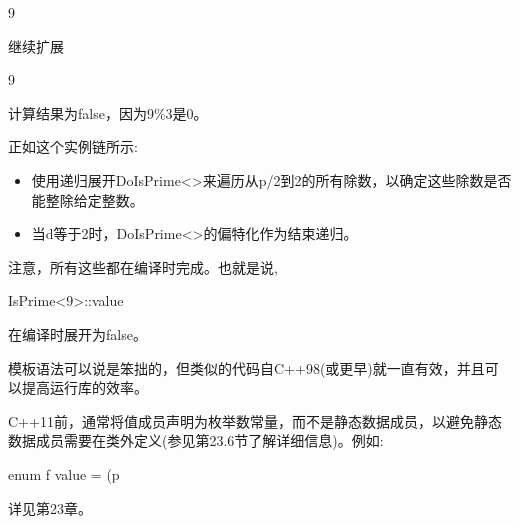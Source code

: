 \begin{cpp}
9%
\end{cpp}

继续扩展

\begin{cpp}
9%
\end{cpp}

计算结果为false，因为9\%3是0。

正如这个实例链所示:

\begin{itemize}
\item 
使用递归展开DoIsPrime<>来遍历从p/2到2的所有除数，以确定这些除数是否能整除给定整数。

\item 
当d等于2时，DoIsPrime<>的偏特化作为结束递归。
\end{itemize}

注意，所有这些都在编译时完成。也就是说,

\begin{cpp}
IsPrime<9>::value
\end{cpp}

在编译时展开为false。

模板语法可以说是笨拙的，但类似的代码自C++98(或更早)就一直有效，并且可以提高运行库的效率。

\begin{notice}C++11前，通常将值成员声明为枚举数常量，而不是静态数据成员，以避免静态数据成员需要在类外定义(参见第23.6节了解详细信息)。例如:
\begin{cpp}
enum f value = (p%
\end{cpp}
\end{notice}

详见第23章。


























